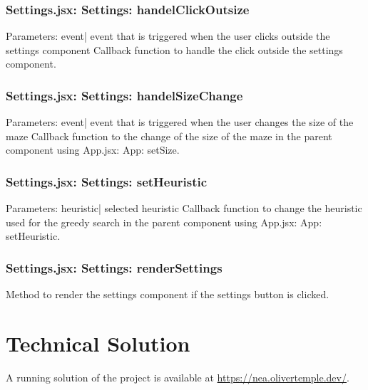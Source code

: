 \documentclass[titlepage]{article}
\begin{document}
\subsubsection{Settings.jsx: Settings: handelClickOutsize}
Parameters:\newline
\indent event| event that is triggered when the user clicks outside the settings component\newline
Callback function to handle the click outside the settings component.

\subsubsection{Settings.jsx: Settings: handelSizeChange}
Parameters:\newline
\indent event| event that is triggered when the user changes the size of the maze\newline
Callback function to the change of the size of the maze in the parent component using App.jsx: App: setSize.

\subsubsection{Settings.jsx: Settings: setHeuristic}
Parameters:\newline
\indent heuristic| selected heuristic\newline
Callback function to change the heuristic used for the greedy search in the parent component using App.jsx: App: setHeuristic.

\subsubsection{Settings.jsx: Settings: renderSettings}
Method to render the settings component if the settings button is clicked.

\section{Technical Solution}
A running solution of the project is available at \url{https://nea.olivertemple.dev/}.
\end{document}
